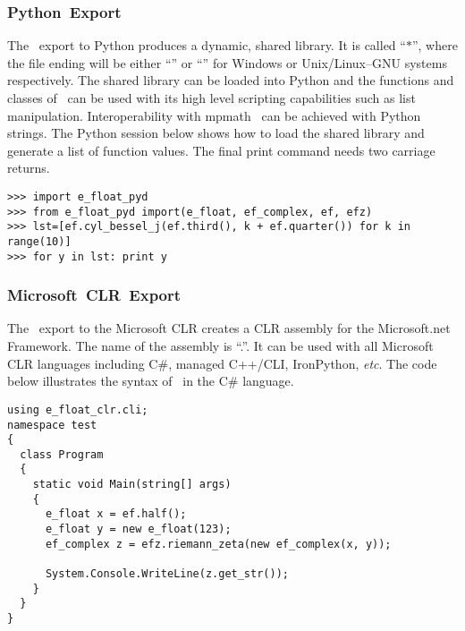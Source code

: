 \subsubsection{Python~Export}
The \efloat\ export to Python produces a dynamic,
shared library. It is called
``{}$\ast$'',
where the file ending will be either ``{}''
or ``{}'' for Windows{\footnotesize {\textregistered}} or
Unix/Linux--GNU systems respectively.
The shared library can be loaded into Python and the functions and classes of
\efloat\ can be used with its high level scripting capabilities
such as list manipulation. Interoperability with
mpmath~\cite{mpmath:website} can be achieved with Python strings.
The Python session below shows how to load the shared library and
generate a list of function values.
The final print command needs two carriage returns.

\lstset{language=python, basicstyle=\courierEight, keywordstyle=\ttfamily}
\begin{lstlisting}
>>> import e_float_pyd
>>> from e_float_pyd import(e_float, ef_complex, ef, efz)
>>> lst=[ef.cyl_bessel_j(ef.third(), k + ef.quarter()) for k in range(10)]
>>> for y in lst: print y
\end{lstlisting}

\subsubsection{Microsoft{\footnotesize {\textregistered}}~CLR~Export}
The \efloat\ export to the Microsoft{\footnotesize {\textregistered}} CLR
creates a CLR assembly for the Microsoft{\footnotesize {\textregistered}}.net Framework.
The name of the assembly is 
``{}.{}''.
It can be used with
all Microsoft{\footnotesize {\textregistered}} CLR
languages including C\#, managed C++/CLI, IronPython, {\emph{etc}}.
The code below illustrates the syntax of \efloat\ in the C\# language.

\lstset{language=[ISO]C++,basicstyle=\courierEight,commentstyle=\itshape,
keywordstyle=\bfseries,extendedchars=true}
\begin{lstlisting}
using e_float_clr.cli;
namespace test
{
  class Program
  {
    static void Main(string[] args)
    {
      e_float x = ef.half();
      e_float y = new e_float(123);
      ef_complex z = efz.riemann_zeta(new ef_complex(x, y));

      System.Console.WriteLine(z.get_str());
    }
  }
}
\end{lstlisting}


